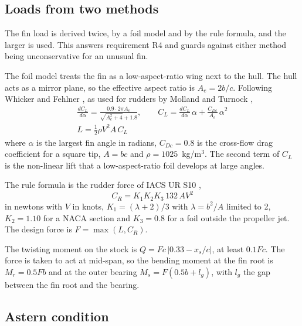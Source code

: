 \subsection{Loads from two methods}

The fin load is derived twice, by a foil model and by the rule formula, and the
larger is used. This answers requirement R4 and guards against either method
being unconservative for an unusual fin.

The foil model treats the fin as a low-aspect-ratio wing next to the hull. The
hull acts as a mirror plane, so the effective aspect ratio is $A_e = 2b/c$.
Following Whicker and Fehlner \cite{whicker1958}, as used for rudders by
Molland and Turnock \cite{molland2007},
\begin{gather}
\frac{dC_L}{d\alpha} = \frac{0.9 \cdot 2\pi A_e}{\sqrt{A_e^2 + 4} + 1.8},
\qquad
C_L = \frac{dC_L}{d\alpha}\,\alpha + \frac{C_{Dc}}{A_e}\,\alpha^2
\label{eq:whicker}\\
L = \tfrac{1}{2}\rho V^2 A\, C_L
\label{eq:lift}
\end{gather}
where $\alpha$ is the largest fin angle in radians, $C_{Dc} = 0.8$ is the
cross-flow drag coefficient for a square tip, $A = bc$ and
$\rho = 1025$~kg/m$^3$. The second term of $C_L$ is the non-linear lift that a
low-aspect-ratio foil develops at large angles.

The rule formula is the rudder force of IACS UR S10 \cite{iacsS10},
\begin{equation}
C_R = K_1 K_2 K_3 \, 132\, A V^2
\label{eq:ur-force}
\end{equation}
in newtons with $V$ in knots, $K_1 = (\lambda + 2)/3$ with $\lambda = b^2/A$
limited to 2, $K_2 = 1.10$ for a NACA section and $K_3 = 0.8$ for a foil
outside the propeller jet. The design force is $F = \max(L, C_R)$.

The twisting moment on the stock is $Q = F c\,|0.33 - x_s/c|$, at least
$0.1Fc$. The force is taken to act at mid-span, so the bending moment at the
fin root is $M_r = 0.5Fb$ and at the outer bearing
$M_s = F(0.5b + l_g)$, with $l_g$ the gap between the fin root and the
bearing.

\subsection{Astern condition}
\label{sec:astern}

